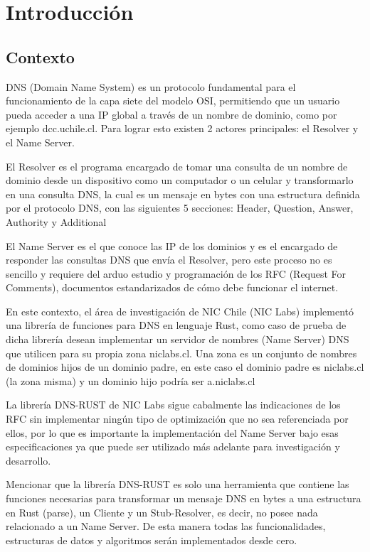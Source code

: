 \chapter{Introducción}

\section{Contexto}

DNS (Domain Name System) es un protocolo fundamental para el funcionamiento de la capa siete del modelo OSI, permitiendo que un usuario pueda 
acceder a una IP global a través de un nombre de dominio, como por ejemplo dcc.uchile.cl. Para lograr esto existen 2 actores principales: 
el Resolver y el Name Server.

El Resolver es el programa encargado de tomar una consulta de un nombre de dominio desde un dispositivo como un computador o un celular y 
transformarlo en una consulta DNS, la cual es un mensaje en bytes con una estructura definida por el protocolo DNS, con las siguientes 5 
secciones: Header, Question, Answer, Authority y Additional

El Name Server es el que conoce las IP de los dominios y es el encargado de responder las consultas DNS que envía el Resolver, pero este proceso
no es sencillo y requiere del arduo estudio y programación de los RFC (Request For Comments), documentos estandarizados de cómo debe funcionar 
el internet.

En este contexto, el área de investigación de NIC Chile (NIC Labs) implementó una librería de funciones para DNS en lenguaje Rust, como 
caso de prueba de dicha librería desean implementar un servidor de nombres (Name Server) DNS que utilicen para su propia zona niclabs.cl. 
Una zona es un conjunto de nombres de dominios hijos de un dominio padre, en este caso el dominio padre es niclabs.cl (la zona misma) y un dominio hijo podría ser a.niclabs.cl

La librería DNS-RUST  de NIC Labs sigue cabalmente las indicaciones de los RFC sin implementar ningún tipo de optimización que no sea 
referenciada por ellos, por lo que es importante la implementación del Name Server bajo esas especificaciones ya que puede ser utilizado 
más adelante para investigación y desarrollo.

Mencionar que la librería DNS-RUST es solo una herramienta que contiene las funciones necesarias para transformar un mensaje DNS en bytes a 
una estructura en Rust (parse), un Cliente y un Stub-Resolver, es decir, no posee nada relacionado a un Name Server. De esta manera todas las 
funcionalidades, estructuras de datos y algoritmos serán implementados desde cero. 


